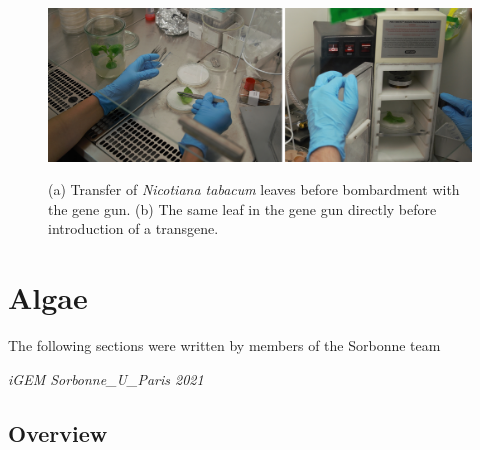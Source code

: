 \begin{figure}[!htbp]
    \centering
    \includegraphics[width=\textwidth]{images/chap3/higher plants/image5.jpg}
    \label{fig:ch3high05}
    \caption{(a) Transfer of \textit{Nicotiana tabacum} leaves before bombardment with the gene gun. (b) The same leaf in the gene gun directly before introduction of a transgene.} 
\end{figure}
\FloatBarrier

\pagebreak

\section{Algae}
\epigraph{The following sections were written by members of the Sorbonne team}{\textit{iGEM Sorbonne\_U\_Paris 2021}}

\subsection{Overview}

